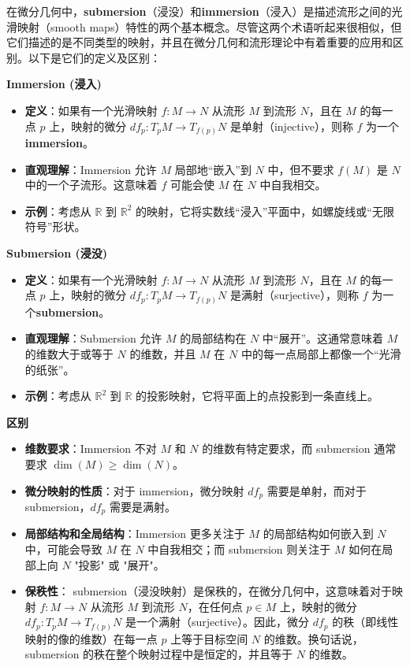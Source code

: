 \documentclass[lang=cn,zihao=-4,a4paper,fontset=none]{beautybook}
\begin{document}
    \begin{proposition}
在微分几何中，\textbf{submersion}（浸没）和\textbf{immersion}（浸入）是描述流形之间的光滑映射（smooth maps）特性的两个基本概念。尽管这两个术语听起来很相似，但它们描述的是不同类型的映射，并且在微分几何和流形理论中有着重要的应用和区别。以下是它们的定义及区别：

\textbf{Immersion (浸入)}
\begin{itemize}
    \item \textbf{定义}：如果有一个光滑映射 $f: M \rightarrow N$ 从流形 $M$ 到流形 $N$，且在 $M$ 的每一点 $p$ 上，映射的微分 $df_p: T_pM \rightarrow T_{f(p)}N$ 是单射（injective），则称 $f$ 为一个\textbf{immersion}。
    \item \textbf{直观理解}：Immersion 允许 $M$ 局部地“嵌入”到 $N$ 中，但不要求 $f(M)$ 是 $N$ 中的一个子流形。这意味着 $f$ 可能会使 $M$ 在 $N$ 中自我相交。
    \item \textbf{示例}：考虑从 $\mathbb{R}$ 到 $\mathbb{R}^2$ 的映射，它将实数线“浸入”平面中，如螺旋线或“无限符号”形状。
\end{itemize}

\textbf{Submersion (浸没)}
\begin{itemize}
    \item \textbf{定义}：如果有一个光滑映射 $f: M \rightarrow N$ 从流形 $M$ 到流形 $N$，且在 $M$ 的每一点 $p$ 上，映射的微分 $df_p: T_pM \rightarrow T_{f(p)}N$ 是满射（surjective），则称 $f$ 为一个\textbf{submersion}。
    \item \textbf{直观理解}：Submersion 允许 $M$ 的局部结构在 $N$ 中“展开”。这通常意味着 $M$ 的维数大于或等于 $N$ 的维数，并且 $M$ 在 $N$ 中的每一点局部上都像一个“光滑的纸张”。
    \item \textbf{示例}：考虑从 $\mathbb{R}^2$ 到 $\mathbb{R}$ 的投影映射，它将平面上的点投影到一条直线上。
\end{itemize}
\tcblower
\textbf{区别}
\begin{itemize}
    \item \textbf{维数要求}：Immersion 不对 $M$ 和 $N$ 的维数有特定要求，而 submersion 通常要求 $\dim(M) \geq \dim(N)$。
    \item \textbf{微分映射的性质}：对于 immersion，微分映射 $df_p$ 需要是单射，而对于 submersion，$df_p$ 需要是满射。
    \item \textbf{局部结构和全局结构}：Immersion 更多关注于 $M$ 的局部结构如何嵌入到 $N$ 中，可能会导致 $M$ 在 $N$ 中自我相交；而 submersion 则关注于 $M$ 如何在局部上向 $N$ "投影" 或 "展开"。
    \item \textbf{保秩性}： submersion（浸没映射）是保秩的，在微分几何中，这意味着对于映射 \( f: M \rightarrow N \) 从流形 \( M \) 到流形 \( N \)，在任何点 \( p \in M \) 上，映射的微分 \( df_p: T_pM \rightarrow T_{f(p)}N \) 是一个满射（surjective）。因此，微分 \( df_p \) 的秩（即线性映射的像的维数）在每一点 \( p \) 上等于目标空间 \( N \) 的维数。换句话说，submersion 的秩在整个映射过程中是恒定的，并且等于 \( N \) 的维数。


\end{itemize}
\end{proposition}
\end{document}
